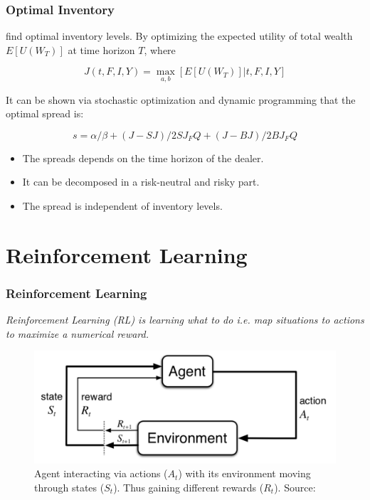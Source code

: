 \documentclass[aspectratio=1610]{beamer}
\begin{document}
\begin{frame}
  \frametitle{\hfill Optimal Inventory}
  \textcite{ho1981optimal} find optimal inventory levels. By optimizing the expected utility of total wealth $E[U(W_T)]$ at time horizon $T$, where 
  
\begin{equation}
    \label{eq:h2}
    J(t,F,I,Y) = \underset{a,b}{\max}[E[U(W_T)] | t,F,I,Y]
\end{equation}

It can be shown \parencite{ho1981optimal, o1995market} via stochastic optimization and dynamic programming that the optimal spread is:

\begin{equation}
    \label{eq:13h}
    s = \alpha / \beta + (J-SJ)/2SJ_{F}Q + (J-BJ)/2BJ_{F}Q
\end{equation}

\begin{itemize}
    \item The spreads depends on the time horizon of the dealer. 
    \item It can be decomposed in a risk-neutral and risky part.
    \item The spread is independent of inventory levels.
\end{itemize}

\end{frame}

\section{Reinforcement Learning}

\begin{frame}
  \frametitle{\hfill Reinforcement Learning}
  \textit{Reinforcement Learning (RL) is learning what to do i.e. map situations to actions to maximize a numerical reward. }

  \begin{block}{}
    \begin{figure}[H]
    \centering
    \includegraphics[scale=.60]{basicRL.png}
    \caption{Agent interacting via actions ($A_t$) with its environment moving through states ($S_t$). Thus gaining different rewards ($R_t$). Source: \textcite{sutton1998reinforcement}}
    \label{fig:2}
\end{figure}
  \end{block}

\end{frame}
\end{document}
